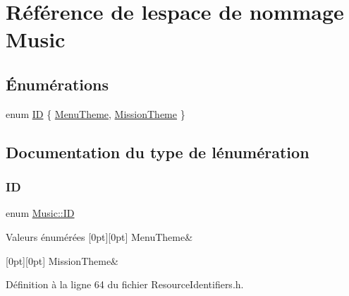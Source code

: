 \hypertarget{namespace_music}{}\section{Référence de l\textquotesingle{}espace de nommage Music}
\label{namespace_music}
\subsection*{Énumérations}
\begin{DoxyCompactItemize}
\item 
enum \hyperlink{namespace_music_ad5e0c8c2e2e7bdcbffbb125051531b86}{ID} \{ \hyperlink{namespace_music_ad5e0c8c2e2e7bdcbffbb125051531b86a6bcadfc9c1f05aec18efb26a7bec3bc0}{Menu\+Theme}, 
\hyperlink{namespace_music_ad5e0c8c2e2e7bdcbffbb125051531b86a857a2b78d8b247d16131778c5403d643}{Mission\+Theme}
 \}
\end{DoxyCompactItemize}


\subsection{Documentation du type de l\textquotesingle{}énumération}
\hypertarget{namespace_music_ad5e0c8c2e2e7bdcbffbb125051531b86}{}\label{namespace_music_ad5e0c8c2e2e7bdcbffbb125051531b86} 
\subsubsection{\texorpdfstring{ID}{ID}}
{\footnotesize\ttfamily enum \hyperlink{namespace_music_ad5e0c8c2e2e7bdcbffbb125051531b86}{Music\+::\+ID}}

\begin{DoxyEnumFields}{Valeurs énumérées}
[0pt][0pt]{}\hypertarget{namespace_music_ad5e0c8c2e2e7bdcbffbb125051531b86a6bcadfc9c1f05aec18efb26a7bec3bc0}{}\label{namespace_music_ad5e0c8c2e2e7bdcbffbb125051531b86a6bcadfc9c1f05aec18efb26a7bec3bc0} 
Menu\+Theme&\\
\hline

[0pt][0pt]{}\hypertarget{namespace_music_ad5e0c8c2e2e7bdcbffbb125051531b86a857a2b78d8b247d16131778c5403d643}{}\label{namespace_music_ad5e0c8c2e2e7bdcbffbb125051531b86a857a2b78d8b247d16131778c5403d643} 
Mission\+Theme&\\
\hline

\end{DoxyEnumFields}


Définition à la ligne 64 du fichier Resource\+Identifiers.\+h.

